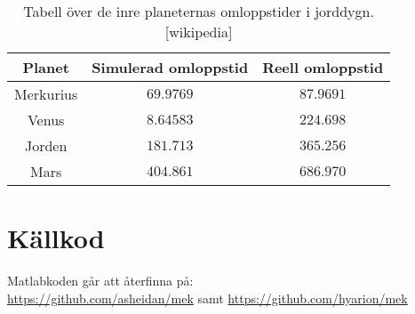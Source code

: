 \documentclass[a4]{article}
\begin{document}
\begin{table}
\begin{center}
\begin{tabular}{c|c|c}
	Planet    & Simulerad omloppstid & Reell omloppstid \\
	\hline
	Merkurius & $69.9769$ &  $87.9691$ \\
	Venus     & $8.64583$ &  $224.698$ \\ 
	Jorden    & $181.713$ &  $365.256$ \\
	Mars      & $404.861$ &  $686.970$
\end{tabular}
\caption{
	Tabell över de inre planeternas omloppstider i jorddygn.[wikipedia]
}
\label{table:solarsystem:orbit:reality:check}
\end{center}
\end{table}

\section{Källkod}
	Matlabkoden går att återfinna på:\\
	\url{https://github.com/asheidan/mek} samt
	\url{https://github.com/hyarion/mek}
	
\end{document}
